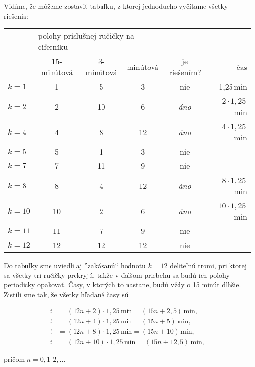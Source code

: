{Vidíme, že môžeme zostaviť tabuľku, z ktorej jednoducho vyčítame všetky riešenia:
\begin{center}
\begin{tabular}{l c c c c r}
\hline
 & \multicolumn{3}{l}{polohy príslušnej ručičky na ciferníku} &  & \\
 & 15-minútová & 3-minútová & minútová & je riešením? & čas \\
 \hline
 $k=1$ & 1 & 5 & 3 & nie & 1,25\,min \\
 $k=2$ & 2 & 10 & 6 & \textit{áno} & $2\cdot1,25$\,min \\
 $k=4$ & 4 & 8 & 12 & \textit{áno} & $4\cdot1,25$\,min \\
 $k=5$ & 5 & 1 & 3 & nie &  \\
 $k=7$ & 7 & 11 & 9 & nie &  \\
 $k=8$ & 8 & 4 & 12 & \textit{áno} & $8\cdot 1,25$\,min \\
 $k=10$ & 10 & 2 & 6 & \textit{áno} & $10\cdot1,25$\,min \\
 $k=11$ & 11 & 7 & 9 & nie & \\
 $k=12$ & 12 & 12 & 12 & nie & \\
 \hline
\end{tabular}
\end{center}

Do tabuľky sme uviedli aj ”zakázanú“ hodnotu $k = 12$ deliteľnú tromi, pri ktorej sa všetky tri ručičky prekryjú, takže v ďalšom priebehu sa budú ich polohy periodicky opakovať. Časy, v ktorých to nastane, budú vždy o 15 minút dlhšie. Zistili sme tak, že
všetky hľadané časy sú
\begin{center}
\begin{align*}
t &= (12n + 2) \cdot 1, 25\,\text{min} =(15n + 2, 5)\,\text{min},\\
t &= (12n + 4) \cdot 1, 25\,\text{min}= (15n + 5)\,\text{min},\\
t &= (12n + 8) \cdot 1, 25\,\text{min}  = (15n + 10)\,\text{min},\\
t &= (12n + 10) \cdot 1, 25 \,\text{min} = (15n + 12, 5)\,\text{min},
\end{align*}
\end{center}
pričom $n = 0, 1, 2, \ldots$
}